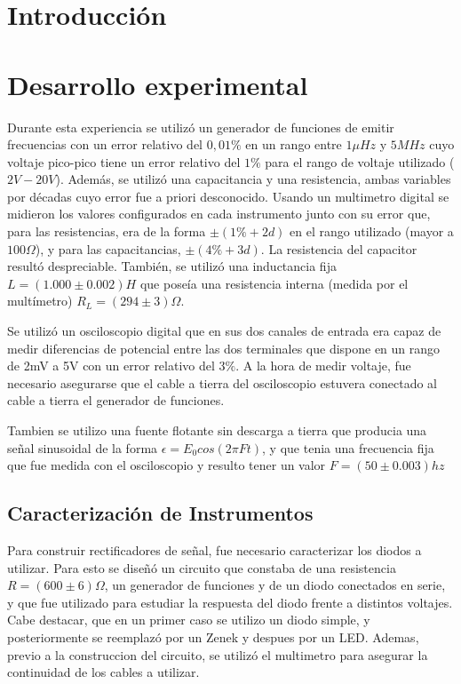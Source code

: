 \documentclass[11pt,a4paper]{article}
\begin{document}
\section{Introducción}\label{sec:intro}




\section{Desarrollo experimental}

Durante esta experiencia se utilizó un generador de funciones de emitir frecuencias con un error relativo del $0,01\%$ en un rango entre $1\mu Hz$ y $5MHz$ cuyo voltaje pico-pico tiene un error relativo del $1\%$ para el rango de voltaje utilizado ($2V-20V$). Además, se utilizó una capacitancia y una resistencia, ambas variables por décadas cuyo error fue a priori desconocido. Usando un multimetro digital se midieron los valores configurados en cada instrumento junto con su error que, para las resistencias, era de la forma $\pm(1\%+2d)$ en el rango utilizado (mayor a $100\Omega$), y para las  capacitancias, $\pm(4\%+3d)$. La resistencia del capacitor resultó despreciable. También, se utilizó una inductancia fija $L = (1.000 \pm 0.002) H$ que poseía una resistencia interna (medida por el multímetro) $R_L = (294 \pm 3) \Omega$.

Se utilizó un osciloscopio digital que en sus dos canales de entrada era capaz de medir diferencias de potencial entre las dos terminales que dispone en un rango de 2mV a 5V con un error relativo del $3\%$. A la hora de medir voltaje, fue necesario asegurarse que el cable a tierra del osciloscopio estuvera conectado al cable a tierra el generador de funciones. 

Tambien se utilizo una fuente flotante sin descarga a tierra que producia una señal sinusoidal de la forma $\epsilon = E_{0}cos(2\pi Ft)$, y que tenia una frecuencia fija que fue medida con el osciloscopio y resulto tener un valor $F = (50 \pm 0.003)hz$


\subsection{Caracterización de Instrumentos}
Para construir rectificadores de señal, fue necesario caracterizar los diodos a utilizar. Para esto se diseñó un circuito que constaba de una resistencia \textbf{$R = (600 \pm 6)\Omega$}, un generador de funciones y de un diodo conectados en serie, y que fue utilizado para estudiar la respuesta del diodo frente a distintos voltajes. Cabe destacar, que en un primer caso se utilizo un diodo simple, y posteriormente se reemplazó por un Zenek y despues por un LED. Ademas, previo a la construccion del circuito, se utilizó el multimetro para asegurar la continuidad de los cables a utilizar.
\end{document}
